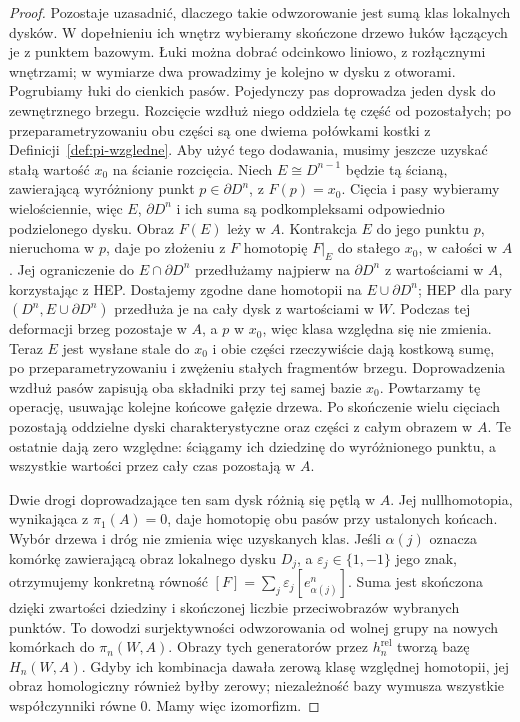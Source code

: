 \begin{proof}
Pozostaje uzasadnić, dlaczego takie odwzorowanie jest sumą klas
lokalnych dysków. W dopełnieniu ich wnętrz wybieramy skończone
drzewo łuków łączących je z punktem bazowym. Łuki można dobrać
odcinkowo liniowo, z rozłącznymi wnętrzami; w wymiarze dwa
prowadzimy je kolejno w dysku z otworami. Pogrubiamy łuki do
cienkich pasów. Pojedynczy pas doprowadza jeden dysk do zewnętrznego
brzegu. Rozcięcie wzdłuż niego oddziela tę część od pozostałych;
po przeparametryzowaniu obu części są one dwiema połówkami kostki
z Definicji~\ref{def:pi-wzgledne}. Aby użyć tego dodawania,
musimy jeszcze uzyskać stałą wartość $x_0$ na ścianie rozcięcia.
Niech $E\cong D^{n-1}$ będzie tą ścianą, zawierającą wyróżniony
punkt $p\in\partial D^n$, z $F(p)=x_0$. Cięcia i pasy wybieramy
wielościennie, więc $E$, $\partial D^n$ i ich suma są podkompleksami
odpowiednio podzielonego dysku.
Obraz $F(E)$ leży w $A$. Kontrakcja $E$ do jego punktu $p$,
nieruchoma w $p$, daje po złożeniu z $F$ homotopię
$F|_E$ do stałego $x_0$, w całości w $A$.
Jej ograniczenie do $E\cap\partial D^n$ przedłużamy najpierw
na $\partial D^n$ z wartościami w $A$, korzystając z HEP.
Dostajemy zgodne dane homotopii na $E\cup\partial D^n$;
HEP dla pary $(D^n,E\cup\partial D^n)$ przedłuża je na cały dysk
z wartościami w $W$. Podczas tej deformacji brzeg pozostaje
w $A$, a $p$ w $x_0$, więc klasa względna się nie zmienia.
Teraz $E$ jest wysłane stale do $x_0$ i obie części rzeczywiście
dają kostkową sumę, po przeparametryzowaniu i zwężeniu stałych
fragmentów brzegu. Doprowadzenia wzdłuż pasów zapisują oba składniki
przy tej samej bazie $x_0$.
Powtarzamy tę operację, usuwając kolejne końcowe gałęzie drzewa.
Po skończenie wielu cięciach pozostają oddzielne dyski charakterystyczne
oraz części z całym obrazem w $A$. Te ostatnie dają zero względne:
ściągamy ich dziedzinę do wyróżnionego punktu, a wszystkie wartości
przez cały czas pozostają w $A$.

Dwie drogi doprowadzające ten sam dysk różnią się pętlą w $A$.
Jej nullhomotopia, wynikająca z $\pi_1(A)=0$, daje homotopię
obu pasów przy ustalonych końcach. Wybór drzewa i dróg nie zmienia
więc uzyskanych klas. Jeśli $\alpha(j)$ oznacza komórkę zawierającą
obraz lokalnego dysku $D_j$, a $\varepsilon_j\in\{1,-1\}$ jego znak,
otrzymujemy konkretną równość
$[F]=\sum_j\varepsilon_j[e_{\alpha(j)}^n]$.
Suma jest skończona dzięki zwartości dziedziny i skończonej liczbie
przeciwobrazów wybranych punktów.
To dowodzi surjektywności
odwzorowania od wolnej grupy
na nowych komórkach
do $\pi_n(W,A)$.
Obrazy tych generatorów
przez $h_n^{\mathrm{rel}}$
tworzą bazę
$H_n(W,A)$. Gdyby ich
kombinacja dawała
zerową klasę względnej
homotopii, jej obraz
homologiczny również
byłby zerowy; niezależność
bazy wymusza wszystkie
współczynniki równe $0$.
Mamy więc izomorfizm.


\end{proof}
